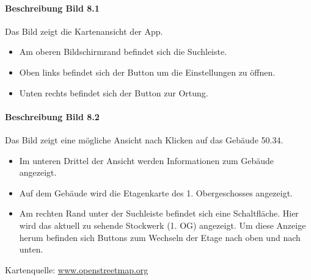 \paragraph{Beschreibung Bild 8.1}
Das Bild zeigt die Kartenansicht der App.
\begin{itemize}
    \item Am oberen Bildschirmrand befindet sich die Suchleiste.
    \item Oben links befindet sich der Button um die Einstellungen zu öffnen.
    \item Unten rechts befindet sich der Button zur Ortung.
\end{itemize}
\paragraph{Beschreibung Bild 8.2}
Das Bild zeigt eine mögliche Ansicht nach Klicken auf das Gebäude 50.34.
\begin{itemize}
    \item Im unteren Drittel der Ansicht werden Informationen zum Gebäude angezeigt.
    \item Auf dem Gebäude wird die \Gls{Etagenkarte} des 1. Obergeschosses angezeigt.
    \item Am rechten Rand unter der Suchleiste befindet sich eine Schaltfläche. Hier wird das aktuell zu sehende Stockwerk (1. OG) angezeigt. Um diese Anzeige herum befinden sich Buttons zum Wechseln der Etage nach oben und nach unten.
\end{itemize}
Kartenquelle: \href{https://www.openstreetmap.org/}{www.openstreetmap.org}
